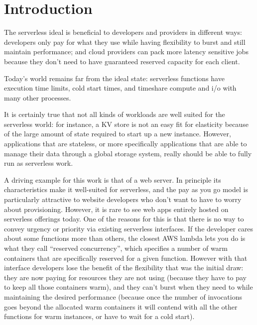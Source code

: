 \section{Introduction}

The serverless ideal is beneficial to developers and providers in different
ways: developers only pay for what they use while having flexibility to burst
and still maintain performance; and cloud providers can pack more latency
sensitive jobs because they don’t need to have guaranteed reserved capacity for
each client.

Today’s world remains far from the ideal state: serverless functions have
execution time limits, cold start times, and timeshare compute and i/o with many
other processes.

It is certainly true that not all kinds of workloads are well suited for the
serverless world: for instance, a KV store is not an easy fit for elasticity
because of the large amount of state required to start up a new instance.
However, applications that are stateless, or more specifically applications that
are able to manage their data through a global storage system, really should be
able to fully run as serverless work.

A driving example for this work is that of a web server. In principle its
characteristics make it well-suited for serverless, and the pay as you go model
is particularly attractive to website developers who don’t want to have to worry
about provisioning. However, it is rare to see web apps entirely hosted on
serverless offerings today. One of the reasons for this is that there is no way
to convey urgency or priority via existing serverless interfaces. If the
developer cares about some functions more than others, the closest AWS lambda
lets you do is what they call “reserved concurrency”, which specifies a number
of warm containers that are specifically reserved for a given function. However
with that interface developers lose the benefit of the flexibility that was the
initial draw: they are now paying for resources they are not using (because they
have to pay to keep all those containers warm), and they can’t burst when they
need to while maintaining the desired performance (because once the number of
invocations goes beyond the allocated warm containers it will contend with all
the other functions for warm instances, or have to wait for a cold start).


